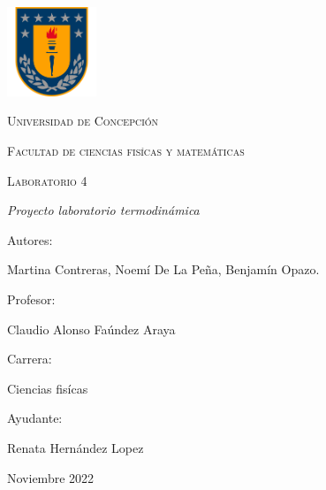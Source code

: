 \documentclass[a4paper, 12p]{article}
\begin{document}
\begin{titlepage}
      \begin{center}     
              
            \includegraphics[width=0.2\textwidth]{img/escudo_udec.png}                       %
            
            
            
            \vspace{1cm}
            \textsc{{\LARGE Universidad de Concepción}}
            
            \vspace{1cm}
            {\scshape\Large Facultad de ciencias fisícas y matemáticas \par}
            \vspace{2cm}
            {\scshape\Huge Laboratorio 4 \par}
            \vspace{2cm}
            {\itshape\Large Proyecto laboratorio termodinámica \par}
            \vfill
            {\Large Autores: \par}
            {\Large Martina Contreras, Noemí De La Peña, Benjamín Opazo. \par}
            \vfill
            \vfill
            {\Large Profesor: \par}
            {\Large Claudio Alonso Faúndez Araya \par}
            \vfill
            \vfill
            {\Large Carrera: \par}
            {\Large Ciencias fisícas \par}
            \vfill
            \vfill
            {\Large Ayudante: \par}
            {\Large Renata Hernández Lopez \par}
            \vfill
            {\Large Noviembre 2022 \par}
      \end{center}
\end{titlepage}            
 

\tableofcontents
\newpage

\end{document}
